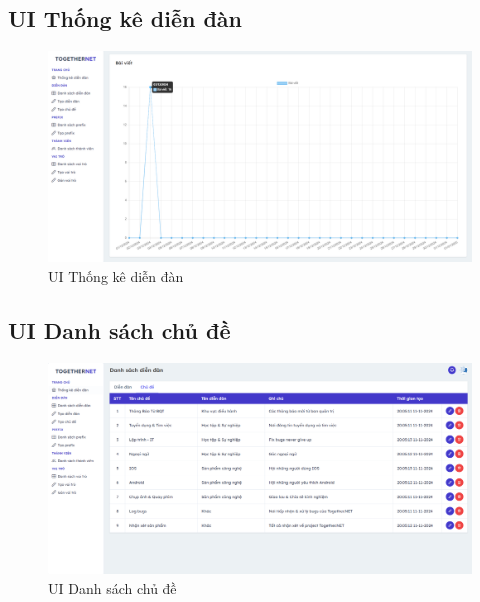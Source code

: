 \documentclass[../index.tex]{subfiles}
\begin{document}
    \subsection{UI Thống kê diễn đàn}
    \begin{figure}[H]
        \centering
        \includegraphics[width=1\linewidth]{figures/demo/management-dashboard-page-2.png}
        \caption{UI Thống kê diễn đàn}
    \end{figure}

    \subsection{UI Danh sách chủ đề}
    \begin{figure}[H]
        \centering
        \includegraphics[width=1\linewidth]{figures/demo/management-topic-page.png}
        \caption{UI Danh sách chủ đề}
    \end{figure}
\end{document}
